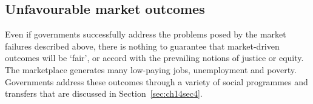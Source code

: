 \subsection*{Unfavourable market outcomes}

Even if governments successfully address the problems posed by the market
failures described above, there is nothing to guarantee that market-driven
outcomes will be `fair', or accord with the prevailing notions of justice or
equity. The marketplace generates many low-paying jobs, unemployment and
poverty. Governments address these outcomes through a variety of social
programmes and transfers that are discussed in Section~\ref{sec:ch14sec4}.
